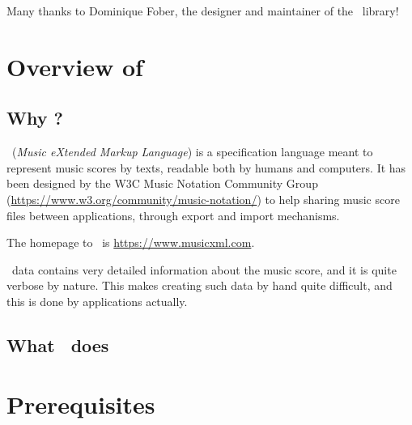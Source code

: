 \documentclass[12pt,a4paper]{article}
\begin{document}
Many thanks to Dominique Fober, the designer and maintainer of the \lib\ library!


\section{Overview of \xmlToLy\ }

\subsection{Why \xmlToLy?}

\mxml\ ({\it Music eXtended Markup Language}) is a specification language meant to represent music scores by texts, readable both by humans and computers. It has been designed by the W3C Music Notation Community Group (\url{https://www.w3.org/community/music-notation/}) to help sharing music score files between applications, through export and import mechanisms.

The homepage to \mxml\ is \url{https://www.musicxml.com}.

\mxml\ data contains very detailed information about the music score, and it is quite verbose by nature. This makes creating such data by hand quite difficult, and this is done by applications actually.

\subsection{What \xmlToLy\ does}


\section{Prerequisites}
\end{document}
